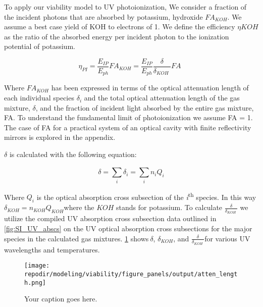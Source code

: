 To apply our viability model to UV photoionization, We consider a fraction of the incident photons that are absorbed by potassium, hydroxide \(FA_{KOH}\). We assume a best case yield of KOH to electrons of 1. We define the efficiency $\eta{KOH}$ as the ratio of the absorbed energy per incident photon to the ionization potential of potassium.


\begin{equation}
\eta_{PI} = \frac{E_{IP}}{E_{ph}}FA_{KOH} = \frac{E_{IP}}{E_{ph}}\frac{\delta}{\delta_{KOH}\ }FA\ \ 
\end{equation}

Where \(FA_{KOH}\) has been expressed in terms of the optical attenuation length of each individual species \(\delta_{i}\) and the total optical attenuation length of the gas mixture, \(\delta\), and the fraction of incident light absorbed by the entire gas mixture, FA. To understand the fundamental limit of photoionization we assume FA = 1. The case of FA for a practical system of an optical cavity with finite reflectivity mirrors is explored in the appendix.

\(\delta\) is calculated with the following equation:

\begin{equation}
\delta = \sum_{i}^{}\delta_{i} = \sum_{i}^{}{n_{i}Q_{i}}
\end{equation}

Where \(Q_{i}\) is the optical absorption cross subsection of the \emph{i}\textsuperscript{th} species. In this way \(\delta_{KOH} = n_{KOH}Q_{KOH}\)where the \(KOH\) stands for potassium. To calculate \(\frac{\delta}{\delta_{KOH}\ }\) we utilize the compiled UV absorption cross subsection data outlined in \ref{fig:SI_UV_abscs} on the UV optical absorption cross subsections for the major species in the calculated gas mixtures. \ref{fig:SI_atten_length} shows\(\ \delta\), \(\delta_{KOH}\), and \(\frac{\delta}{\delta_{KOH}\ }\)for various UV wavelengths and temperatures.


\begin{figure}[ht]
    \centering
    \texttt{[image: \\repodir/modeling/viability/figure\_panels/output/atten\_length.png]}
    \caption{Your caption goes here.}
    \label{fig:SI_atten_length}
\end{figure}


